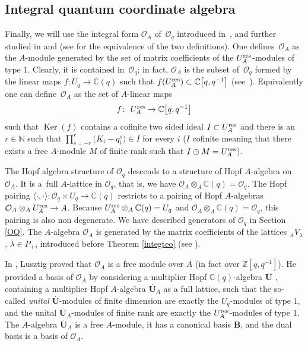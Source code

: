 \documentclass[pdftex]{sigma}%
\numberwithin{equation}{section}
\numberwithin{figure}{section}
\newcommand{\Oq}{\Oo_{q}}
\newcommand{\mc}{\mathbb{C}}
\newcommand{\mz}{\mathbb{Z}}
\newcommand{\Oo}{{\mathcal O}}
\newcommand{\ra}{\rightarrow}
\begin{document}
\subsection{Integral quantum coordinate algebra} Finally, we will use the integral form ${\mathcal O}_A$ of~$\Oq$ introduced in~\cite{Lusztig2}, and further studied in \cite{Lusztig} and \cite{DC-L} (see \cite[Remark 4.1]{DC-L} for the equivalence of the two definitions). One defines~${\mathcal O}_A$ as the $A$-module generated by the set of matrix coefficients of the $U_A^{\rm res}$-modules of type $1$. Clearly, it is contained in~$\Oq$; in fact, ${\mathcal O}_A$ is the subset of~$\Oq$ formed by the linear maps $f\colon U_q\ra {\mathbb C}(q)$ such that $f(U_A^{\rm res}) \subset \mc\big[q,q^{-1}\big]$ (see~\cite[Section~7]{Lusztig2}). Equivalently one can define~${\mathcal O}_A$ as the set of $A$-linear maps
\[f\colon \ U_A^{\rm res}\ra \mc\big[q,q^{-1}\big]\]
such that $\operatorname{Ker}(f)$ contains a cofinite two sided ideal $I\subset U_A^{\rm res}$ and there is an $r\in \mathbb{N}$ such that $ \prod_{s=-r}^r \big(K_i - q_i^s\big) \in I$ for every $i$ ($I$ cofinite meaning that there exists a free $A$-module $M$ of finite rank such that $I\oplus M = U_A^{\rm res}$).

The Hopf algebra structure of $\Oq$ descends to a structure of Hopf $A$-algebra on ${\mathcal O}_A$. It is a~full $A$-lattice in $\Oq$, that is, we have ${\mathcal O}_A\otimes_A {\mathbb C}(q) =\Oq$. The Hopf pairing $\langle\cdot,\cdot \rangle \colon \Oq \times U_q \ra \mc(q)$ restricts to a pairing of Hopf $A$-algebras $\Oo_A \otimes_A U_A^{\rm res} \ra A$. Because $U_A^{\rm res} \otimes_A \mc(q) = U_q$ and ${\mathcal O}_A\otimes_A {\mathbb C}(q) =\Oq$, this pairing is also non degenerate. We have described generators of $\Oo_q$ in Section \ref{OQ}. The $A$-algebra $\Oo_A$ is generated by the matrix coefficients of the lattices ${}_AV_\lambda$, $\lambda\in {P_+}$, introduced before Theorem \ref{integteo} (see \cite[Section~7.1]{Lusztig2}).

In \cite{Lusztig}, Lusztig proved that $\Oo_A$ is a free module over $A$ (in fact over $\mz[q,q^{-1}]$). He provided a basis of $\Oo_A$ by considering a multiplier Hopf $\mc(q)$-algebra $\stackrel{.}{\mathbf{U}}$ , containing a multiplier Hopf $A$-algebra $\stackrel{.}{\mathbf{U}}_A$ as a full lattice, such that the so-called {\it unital} $\stackrel{.}{\mathbf{U}}$-modules of finite dimension are exactly the $U_q$-modules of type $1$, and the unital $\stackrel{.}{\mathbf{U}}_A$-modules of finite rank are exactly the $U_A^{\rm res}$-modules of type $1$. The $A$-algebra $\stackrel{.}{\mathbf{U}}_A$ is a free $A$-module, it has a canonical basis $\stackrel{.}{\mathbf{B}}$, and the dual basis is a basis of $\Oo_A$.
\end{document}
